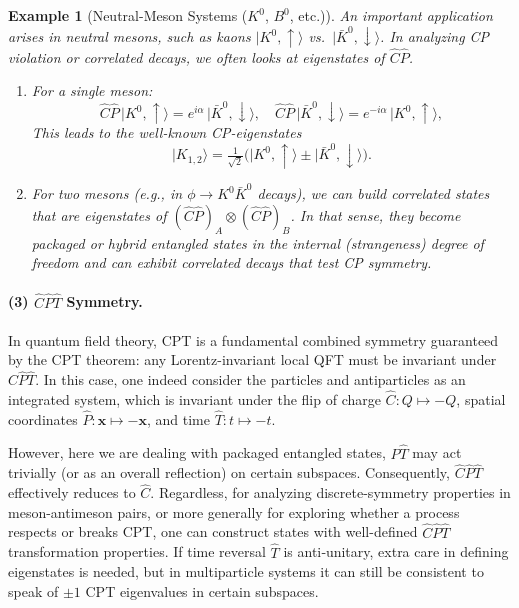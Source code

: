 \documentclass[12pt,a4paper]{article}
\newtheorem{example}{Example}
\begin{document}
\begin{example}[Neutral-Meson Systems ($K^0$, $B^0$, etc.)]
	An important application arises in neutral mesons, such as kaons $\lvert K^0, \uparrow\rangle$ vs.\ $\lvert \bar{K}^0,\downarrow\rangle$. In analyzing CP violation or correlated decays, we often looks at eigenstates of $\hat{C}\hat{P}$.
	\begin{enumerate}
		\item For a single meson:
		\[
		\hat{C}\hat{P} \,\lvert K^0,\uparrow\rangle = e^{i\alpha}\,\lvert \bar{K}^0,\downarrow\rangle,
		\quad
		\hat{C}\hat{P} \,\lvert \bar{K}^0,\downarrow\rangle = e^{-i\alpha}\,\lvert K^0,\uparrow\rangle,
		\]
		This leads to the well-known CP-eigenstates
		\[
		\lvert K_{1,2}\rangle = \tfrac{1}{\sqrt{2}}
		\bigl(\lvert K^0,\uparrow\rangle \pm \lvert \bar{K}^0,\downarrow\rangle\bigr).
		\]
		
		\item For two mesons (e.g., in $\phi \to K^0\bar{K}^0$ decays), we can build correlated states that are eigenstates of $(\hat{C}\hat{P})_A \otimes (\hat{C}\hat{P})_B$.
		In that sense, they become packaged or hybrid entangled states in the internal (strangeness) degree of freedom and can exhibit correlated decays that test CP symmetry.
	\end{enumerate}
	
\end{example}



\paragraph{(3) $\hat{C}\hat{P}\hat{T}$ Symmetry.}
In quantum field theory, CPT is a fundamental combined symmetry guaranteed by the CPT theorem: any Lorentz-invariant local QFT must be invariant under $\hat{C}\hat{P}\hat{T}$.
In this case, one indeed consider the particles and antiparticles as an integrated system, which is invariant under the flip of charge $\hat{C}: Q \mapsto -Q$, spatial coordinates $\hat{P}: \mathbf{x} \mapsto -\mathbf{x}$, and time $\hat{T}: t \mapsto -t$.

However, here we are dealing with packaged entangled states, $\hat{P}\hat{T}$ may act trivially (or as an overall reflection) on certain subspaces.
Consequently, $\hat{C}\hat{P}\hat{T}$ effectively reduces to $\hat{C}$. Regardless, for analyzing discrete-symmetry properties in meson-antimeson pairs, or more generally for exploring whether a process respects or breaks CPT, one can construct states with well-defined $\hat{C}\hat{P}\hat{T}$ transformation properties. If time reversal $\hat{T}$ is anti‑unitary, extra care in defining eigenstates is needed, but in multiparticle systems it can still be consistent to speak of $\pm 1$ CPT eigenvalues in certain subspaces.
\end{document}
